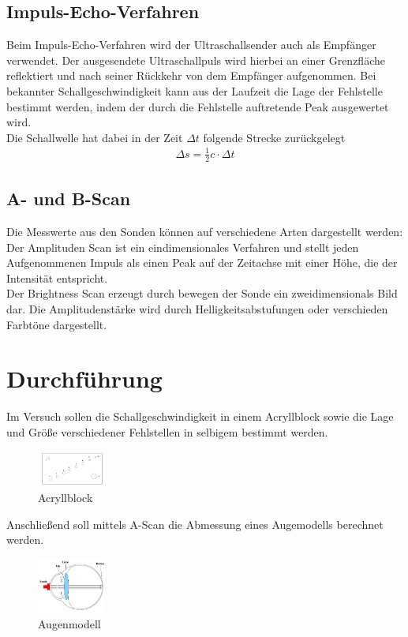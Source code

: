 \subsection{Impuls-Echo-Verfahren}
Beim Impuls-Echo-Verfahren wird der Ultraschallsender auch als Empfänger verwendet. Der ausgesendete Ultraschallpuls wird hierbei an einer Grenzfläche reflektiert und nach seiner Rückkehr von dem Empfänger aufgenommen. Bei bekannter Schallgeschwindigkeit kann aus der Laufzeit die Lage der Fehlstelle bestimmt werden, indem der durch die Fehlstelle auftretende Peak ausgewertet wird.\\
Die Schallwelle hat dabei in der Zeit $\Delta t$ folgende Strecke zurückgelegt
\begin{align}
	\Delta s = \frac{1}{2} c \cdot \Delta t
	\label{eq_strecke}
\end{align}

\subsection{A- und B-Scan}
Die Messwerte aus den Sonden können auf verschiedene Arten dargestellt werden:\\

Der Amplituden Scan ist ein eindimensionales Verfahren und stellt jeden Aufgenommenen Impuls als einen Peak auf der Zeitachse mit einer Höhe, die der Intensität entspricht.\\

Der Brightness Scan erzeugt durch bewegen der Sonde ein zweidimensionals Bild dar. Die Amplitudenstärke wird durch Helligkeitsabstufungen oder verschieden Farbtöne dargestellt.


\section{Durchführung}
Im Versuch sollen die Schallgeschwindigkeit in einem Acryllblock sowie die Lage und Größe verschiedener Fehlstellen in selbigem bestimmt werden. 
\begin{figure}
\includegraphics[width=0.2\textwidth]{pics/block.jpg}
\caption{\mbox{Acryllblock}}
\end{figure}
Anschließend soll mittels A-Scan die Abmessung eines Augemodells berechnet werden.

\begin{figure}
\includegraphics[width=0.2\textwidth]{pics/auge.jpg}
\caption{\mbox{Augenmodell}}
\label{pic_auge}
\end{figure}

